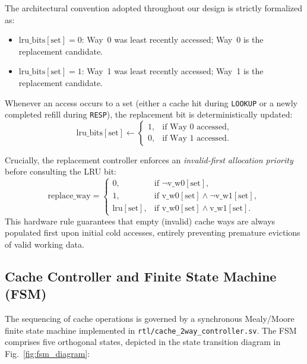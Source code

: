 \documentclass[conference]{IEEEtran}
\begin{document}
The architectural convention adopted throughout our design is strictly formalized as:
\begin{itemize}
    \item $\text{lru\_bits}[\text{set}] = 0$: Way~0 was least recently accessed; Way~0 is the replacement candidate.
    \item $\text{lru\_bits}[\text{set}] = 1$: Way~1 was least recently accessed; Way~1 is the replacement candidate.
\end{itemize}

Whenever an access occurs to a set (either a cache hit during \texttt{LOOKUP} or a newly completed refill during \texttt{RESP}), the replacement bit is deterministically updated:
\begin{equation}
\text{lru\_bits}[\text{set}] \leftarrow \begin{cases}
1, & \text{if Way 0 accessed}, \\
0, & \text{if Way 1 accessed}.
\end{cases}
\end{equation}

Crucially, the replacement controller enforces an \textit{invalid-first allocation priority} before consulting the LRU bit:
\begin{equation}
\text{replace\_way} = \begin{cases}
0, & \text{if } \neg\text{v\_w0}[\text{set}], \\
1, & \text{if } \text{v\_w0}[\text{set}] \land \neg\text{v\_w1}[\text{set}], \\
\text{lru}[\text{set}], & \text{if } \text{v\_w0}[\text{set}] \land \text{v\_w1}[\text{set}].
\end{cases}
\end{equation}
This hardware rule guarantees that empty (invalid) cache ways are always populated first upon initial cold accesses, entirely preventing premature evictions of valid working data.

\subsection{Cache Controller and Finite State Machine (FSM)}
The sequencing of cache operations is governed by a synchronous Mealy/Moore finite state machine implemented in \texttt{rtl/cache\_2way\_controller.sv}. The FSM comprises five orthogonal states, depicted in the state transition diagram in Fig.~\ref{fig:fsm_diagram}:
\end{document}
